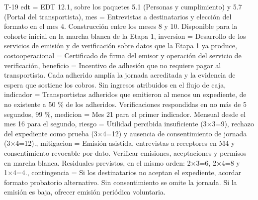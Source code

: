 \begin{formulario}{T-19}
{  edt = {EDT 12.1, sobre los paquetes 5.1 (Personas y cumplimiento) y 5.7 (Portal del transportista)},
  mes = {Entrevistas a destinatarios y elección del formato en el mes 4. Construcción entre los meses 8 y 10. Disponible para la cohorte inicial en la marcha blanca de la Etapa 1},
  inversion = {Desarrollo de los servicios de emisión y de verificación sobre datos que la Etapa 1 ya produce},
  costooperacional = {Certificado de firma del emisor y operación del servicio de verificación},
  beneficio = {Incentivo de adhesión que no requiere pagar al transportista. Cada adherido amplía la jornada acreditada y la evidencia de espera que sostiene los cobros. Sin ingresos atribuidos en el flujo de caja},
  indicador = {Transportistas adheridos que emitieron al menos un expediente, de no existente a 50 \% de los adheridos. Verificaciones respondidas en no más de 5 segundos, 99 \%},
  medicion = {Mes 21 para el primer indicador. Mensual desde el mes 16 para el segundo},
  riesgo = {Utilidad percibida insuficiente (3×3=9), rechazo del expediente como prueba (3×4=12) y ausencia de consentimiento de jornada (3×4=12).},
  mitigacion = {Emisión asistida, entrevistas a receptores en M4 y consentimiento revocable por dato. Verificar emisiones, aceptaciones y permisos en marcha blanca. Residuales previstos, en el mismo orden: 2×3=6, 2×4=8 y 1×4=4.},
  contingencia = {Si los destinatarios no aceptan el expediente, acordar formato probatorio alternativo. Sin consentimiento se omite la jornada. Si la emisión es baja, ofrecer emisión periódica voluntaria.}
}
\clearpage
{}
\end{formulario}

